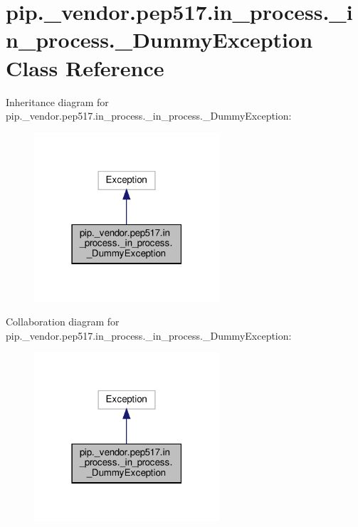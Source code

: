 \hypertarget{classpip_1_1__vendor_1_1pep517_1_1in__process_1_1__in__process_1_1__DummyException}{}\section{pip.\+\_\+vendor.\+pep517.\+in\+\_\+process.\+\_\+in\+\_\+process.\+\_\+\+Dummy\+Exception Class Reference}
\label{classpip_1_1__vendor_1_1pep517_1_1in__process_1_1__in__process_1_1__DummyException}


Inheritance diagram for pip.\+\_\+vendor.\+pep517.\+in\+\_\+process.\+\_\+in\+\_\+process.\+\_\+\+Dummy\+Exception\+:
\nopagebreak
\begin{figure}[H]
\begin{center}
\leavevmode
\includegraphics[width=195pt]{classpip_1_1__vendor_1_1pep517_1_1in__process_1_1__in__process_1_1__DummyException__inherit__graph}
\end{center}
\end{figure}


Collaboration diagram for pip.\+\_\+vendor.\+pep517.\+in\+\_\+process.\+\_\+in\+\_\+process.\+\_\+\+Dummy\+Exception\+:
\nopagebreak
\begin{figure}[H]
\begin{center}
\leavevmode
\includegraphics[width=195pt]{classpip_1_1__vendor_1_1pep517_1_1in__process_1_1__in__process_1_1__DummyException__coll__graph}
\end{center}
\end{figure}


